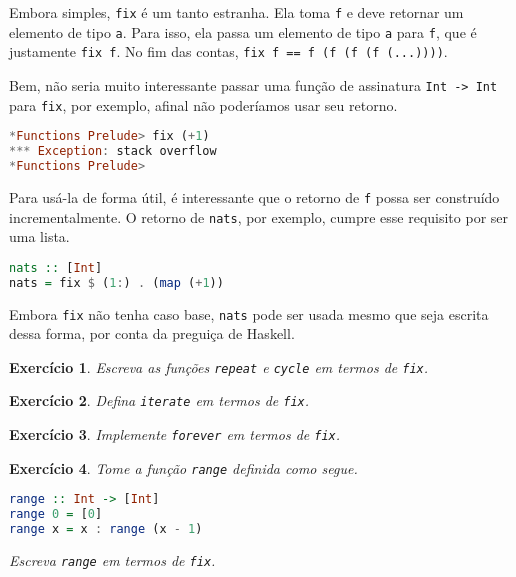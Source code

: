 \documentclass[a4paper]{article}
\newtheorem{exercicio}{Exercício}
\begin{document}
Embora simples, \texttt{fix} é um tanto estranha.
Ela toma \texttt{f} e deve retornar um elemento de tipo \texttt{a}.
Para isso, ela passa um elemento de tipo \texttt{a} para \texttt{f}, que é justamente \texttt{fix f}.
No fim das contas, \texttt{fix f == f (f (f (f (...))))}.

Bem, não seria muito interessante passar uma função de assinatura \texttt{Int -> Int} para \texttt{fix}, por exemplo, afinal não poderíamos usar seu retorno.

\begin{lstlisting}[language=haskell, frame=single]
*Functions Prelude> fix (+1)
*** Exception: stack overflow
*Functions Prelude>
\end{lstlisting}

Para usá-la de forma útil, é interessante que o retorno de \texttt{f} possa ser construído incrementalmente.
O retorno de \texttt{nats}, por exemplo, cumpre esse requisito por ser uma lista.

\begin{lstlisting}[language=haskell, frame=single]
nats :: [Int]
nats = fix $ (1:) . (map (+1))
\end{lstlisting}

Embora \texttt{fix} não tenha caso base, \texttt{nats} pode ser usada mesmo que seja escrita dessa forma, por conta da preguiça de Haskell.

\begin{exercicio}
	Escreva as funções \emph{\texttt{repeat}} e \emph{\texttt{cycle}} em termos de \emph{\texttt{fix}}.
\end{exercicio}

\begin{exercicio}
	Defina \emph{\texttt{iterate}} em termos de \emph{\texttt{fix}}.
\end{exercicio}

\begin{exercicio}
	Implemente \emph{\texttt{forever}} em termos de \emph{\texttt{fix}}.
\end{exercicio}

\pagebreak

\begin{exercicio}
	Tome a função \emph{\texttt{range}} definida como segue.
\begin{lstlisting}[language=haskell, frame=single]
range :: Int -> [Int]
range 0 = [0]
range x = x : range (x - 1)
\end{lstlisting}
	Escreva \emph{\texttt{range}} em termos de \emph{\texttt{fix}}.
\end{exercicio}
\end{document}
